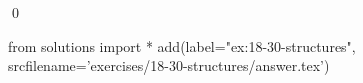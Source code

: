 
\begin{ex}
  \label{ex:18-30-structures}
  
  \qed
\end{ex}
\begin{python0}
from solutions import *
add(label="ex:18-30-structures",
    srcfilename='exercises/18-30-structures/answer.tex')
\end{python0}
